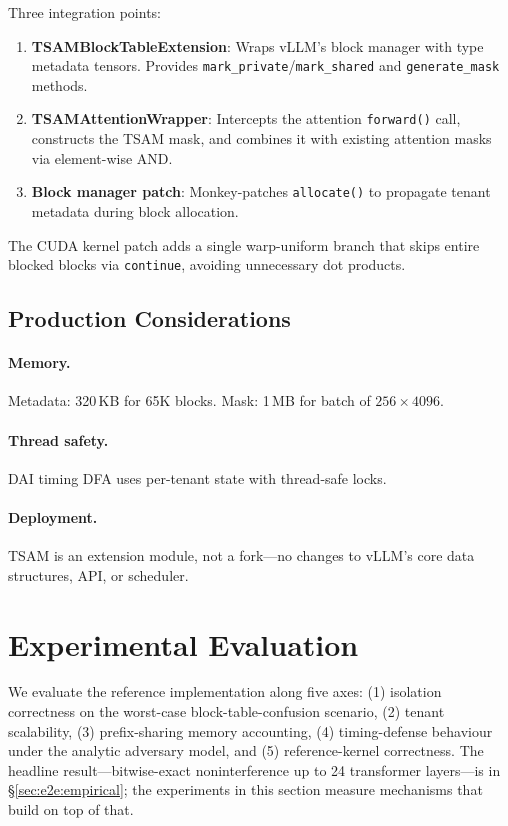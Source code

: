 \documentclass[11pt]{article}
\begin{document}
Three integration points:
\begin{enumerate}[leftmargin=*,itemsep=2pt]
    \item \textbf{TSAMBlockTableExtension}: Wraps vLLM's block manager with type metadata tensors. Provides \texttt{mark\_private}/\texttt{mark\_shared} and \texttt{generate\_mask} methods.
    \item \textbf{TSAMAttentionWrapper}: Intercepts the attention \texttt{forward()} call, constructs the TSAM mask, and combines it with existing attention masks via element-wise AND.
    \item \textbf{Block manager patch}: Monkey-patches \texttt{allocate()} to propagate tenant metadata during block allocation.
\end{enumerate}

The CUDA kernel patch adds a single warp-uniform branch that skips entire blocked blocks via \texttt{continue}, avoiding unnecessary dot products.

\subsection{Production Considerations}

\paragraph{Memory.} Metadata: 320\,KB for 65K blocks. Mask: 1\,MB for batch of $256 \times 4096$.
\paragraph{Thread safety.} DAI timing DFA uses per-tenant state with thread-safe locks.
\paragraph{Deployment.} TSAM is an extension module, not a fork---no changes to vLLM's core data structures, API, or scheduler.

\section{Experimental Evaluation}
\label{sec:experiments}

We evaluate the reference implementation along five axes: (1) isolation
correctness on the worst-case block-table-confusion scenario, (2) tenant
scalability, (3) prefix-sharing memory accounting, (4) timing-defense
behaviour under the analytic adversary model, and (5) reference-kernel
correctness.  The headline result---bitwise-exact noninterference up to
24 transformer layers---is in \S\ref{sec:e2e:empirical}; the experiments
in this section measure mechanisms that build on top of that.
\end{document}
